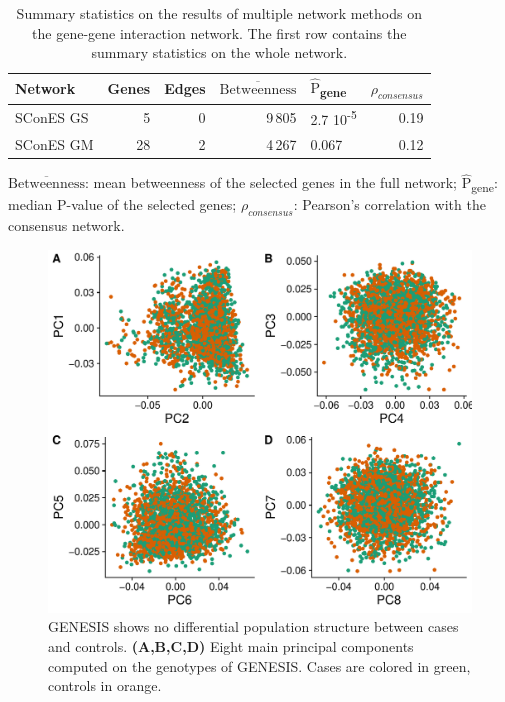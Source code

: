 \documentclass[twocolumn, 10pt]{article}
\newcommand{\mean}[1]{$\overline{\mbox{#1}}$}
\newcommand{\median}[1]{$\hat{\mbox{#1}}$}
\begin{document}
\begin{table}[htbp]
\begin{threeparttable}
  \caption{\label{tab:scones_gene_solutions}
Summary statistics on the results of multiple network methods on the gene-gene interaction network. The first row contains the summary statistics on the whole network.}
\centering
\begin{tabular}{lrrrlr}
Network & Genes & Edges & \mean{Betweenness} & \median{P}\textsubscript{gene} & $\rho_{consensus}$\\
\hline
SConES GS & 5 & 0 & 9\,805 & 2.7 \texttimes{} 10\textsuperscript{-5} & 0.19\\
SConES GM & 28 & 2 & 4\,267 & 0.067 & 0.12\\
\end{tabular}
\begin{tablenotes}
\mean{Betweenness}: mean betweenness of the selected genes in the full network; \median{P}\textsubscript{gene}: median P-value of the selected genes; $\rho_{consensus}$: Pearson's correlation with the consensus network.
\end{tablenotes}
\end{threeparttable}
\end{table}

\begin{figure}[htbp]
\centering
\includegraphics[width=.9\linewidth]{./figures/sfigure_1.pdf}
\caption{\label{sfig:pcs} GENESIS shows no differential population structure between cases and controls. \textbf{(A,B,C,D)} Eight main principal components computed on the genotypes of GENESIS. Cases are colored in green, controls in orange.}
\end{figure}
\end{document}
